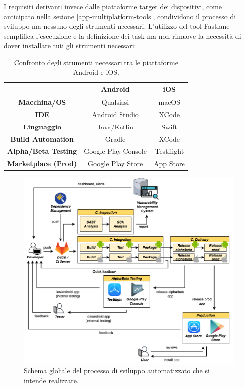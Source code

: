 I requisiti derivanti invece dalle piattaforme target dei dispositivi, come anticipato nella sezione \ref{app-multiplatform-tools}, condividono il processo di sviluppo ma nessuno degli strumenti necessari. L'utilizzo del tool Fastlane semplifica l'esecuzione e la definizione dei task ma non rimuove la necessità di dover installare tuti gli strumenti necessari:

\begin{table}[H]
\centering
    \begin{tabular}{|c|c|c|}
         \hline
           & \textbf{Android} & \textbf{iOS} \\
         \hline
         \textbf{Macchina/OS} & Qualsiasi & macOS \\
         \hline
         \textbf{IDE} & Android Studio & XCode \\
         \hline
         \textbf{Linguaggio} & Java/Kotlin & Swift \\
         \hline
         \textbf{Build Automation} & Gradle & XCode \\
         \hline
         \textbf{Alpha/Beta Testing} & Google Play Console & Testflight \\
         \hline
         \textbf{Marketplace (Prod)} & Google Play Store & App Store \\
         \hline
    \end{tabular}
    \caption{Confronto degli strumenti necessari tra le piattaforme Android e iOS.}
\end{table}

\begin{figure}[H]
    \includegraphics[width=1\textwidth]{img/full-cicd.png}
    \caption{Schema globale del processo di sviluppo automatizzato che si intende realizzare.}
    \label{full-cicd}
\end{figure}

